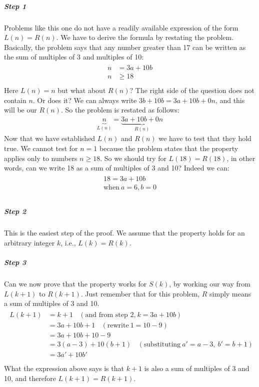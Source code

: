 \documentclass[letterpaper,10pt,english]{sphinxmanual}
\begin{document}
\subparagraph{Step 1}
\label{\detokenize{COMP163/notes/induction:id4}}
Problems like this one do not have a readily available expression of the form \(L(n)=R(n)\). We have to derive the formula by restating the problem. Basically, the problem says that any number greater than 17 can be written as the sum of multiples of 3 and multiples of 10:
\begin{align*}\!\begin{aligned}
n&=3a+10b\\
n&\geq 18\\
\end{aligned}\end{align*}
Here \(L(n)=n\) but what about \(R(n)\)? The right side of the question does not contain \(n\). Or does it? We can always write \(3b+10b=3a+10b+0n\), and this will be our \(R(n)\). So the problem is restated as follows:
\begin{equation*}
\begin{split}\underbrace{n}_{L(n)} = \underbrace{3a+10b+0n}_{R(n)}\end{split}
\end{equation*}
Now that we have established \(L(n)\) and \(R(n)\) we have to test that they hold true. We cannot test for \(n=1\) because the problem states that the property applies only to numbers \(n\geq 18\). So we should try for \(L(18)=R(18)\), in other words, can we write 18 as a sum of multiples of 3 and 10? Indeed we can:
\begin{align*}\!\begin{aligned}
18 =3a+10b\\
\text{when}\ a=6, b=0\\
\end{aligned}\end{align*}

\subparagraph{Step 2}
\label{\detokenize{COMP163/notes/induction:id5}}
This is the easiest step of the proof. We assume that the property holds for an arbitrary integer \(k\), i.e., \(L(k)=R(k)\).


\subparagraph{Step 3}
\label{\detokenize{COMP163/notes/induction:id6}}
Can we now prove that the property works for \(S(k)\), by working our way from \(L(k+1)\) to \(R(k+1)\). Just remember that for this problem, \(R\) simply means a sum of multiples of 3 and 10.
\begin{align*}\!\begin{aligned}
L(k+1) &= k+1\ \ \ \ (\text{and from step 2,}\ k=3a+10b)\\
&=3a+10b+1\ \ \ \ (\text{rewrite}\ 1=10-9)\\
&=3a+10b+10-9\\
&=3(a-3)+10(b+1)\ \ \ \ (\text{substituting}\ a'=a-3,\ b'=b+1)\\
&=3a'+10b'\\
\end{aligned}\end{align*}
What the expression above says is that \(k+1\) is also a sum of multiples of 3 and 10, and therefore \(L(k+1)=R(k+1)\).
\end{document}
